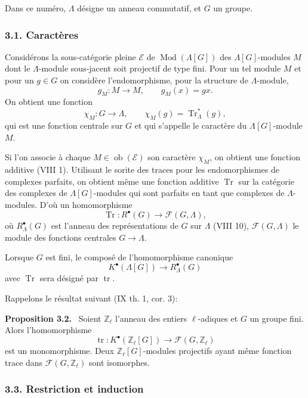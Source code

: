 \documentclass[11pt]{article}
\newenvironment{statement}[1]{\par\medskip\noindent\textbf{#1.}\ }{\par\medskip}
\providecommand{\Tr}{\operatorname{Tr}}
\providecommand{\Tr}{\operatorname{Tr}}
\providecommand{\Ob}{\operatorname{ob}}
\providecommand{\Tr}{\operatorname{Tr}}
\providecommand{\Ob}{\operatorname{ob}}
\providecommand{\Tr}{\operatorname{Tr}}
\providecommand{\Ob}{\operatorname{Ob}}
\providecommand{\Mod}{\operatorname{Mod}}
\providecommand{\tr}{\operatorname{tr}}
\providecommand{\Tr}{\operatorname{Tr}}
\providecommand{\Ob}{\operatorname{ob}}
\providecommand{\Ob}{\operatorname{Ob}}
\begin{document}
Dans ce numéro, $\Lambda$ désigne un anneau commutatif, et $G$ un groupe.

\subsubsection*{3.1. Caractères}

Considérons la sous-catégorie pleine $\mathcal E$ de $\Mod(\Lambda[G])$ des $\Lambda[G]$-modules $M$ dont le $\Lambda$-module sous-jacent soit projectif de type fini. Pour un tel module $M$ et pour un $g\in G$ on considère l'endomorphisme, pour la structure de $\Lambda$-module,
\[
g_M:M\longrightarrow M,
\qquad g_M(x)=gx.
\]
On obtient une fonction
\[
\chi_M:G\longrightarrow \Lambda,
\qquad \chi_M(g)=\Tr^*_\Lambda(g),
\]
qui est une fonction centrale sur $G$ et qui s'appelle le caractère du $\Lambda[G]$-module $M$.

Si l'on associe à chaque $M\in\Ob(\mathcal E)$ son caractère $\chi_M$, on obtient une fonction additive (VIII 1). Utilisant le sorite des traces pour les endomorphismes de complexes parfaits, on obtient même une fonction additive $\Tr$ sur la catégorie des complexes de $\Lambda[G]$-modules qui sont parfaits en tant que complexes de $\Lambda$-modules. D'où un homomorphisme
\[
\Tr:R^{\bullet}(G)\longrightarrow \mathcal F(G,\Lambda),
\]
où $R^{\bullet}_{\Lambda}(G)$ est l'anneau des représentations de $G$ sur $\Lambda$ (VIII 10), $\mathcal F(G,\Lambda)$ le module des fonctions centrales $G\to\Lambda$.

Lorsque $G$ est fini, le composé de l'homomorphisme canonique
\[
K^{\bullet}(\Lambda[G])\longrightarrow R^{\bullet}_{\Lambda}(G)
\]
avec $\Tr$ sera désigné par $\tr$.

Rappelons le résultat suivant (IX th. 1, cor. 3):

\begin{statement}{Proposition 3.2}
Soient $\mathbb Z_\ell$ l'anneau des entiers $\ell$-adiques et $G$ un groupe fini. Alors l'homomorphisme
\[
\tr:K^{\bullet}(\mathbb Z_\ell[G])\longrightarrow \mathcal F(G,\mathbb Z_\ell)
\]
est un monomorphisme. Deux $\mathbb Z_\ell[G]$-modules projectifs ayant même fonction trace dans $\mathcal F(G,\mathbb Z_\ell)$ sont isomorphes.
\end{statement}

\subsubsection*{3.3. Restriction et induction}
\end{document}
